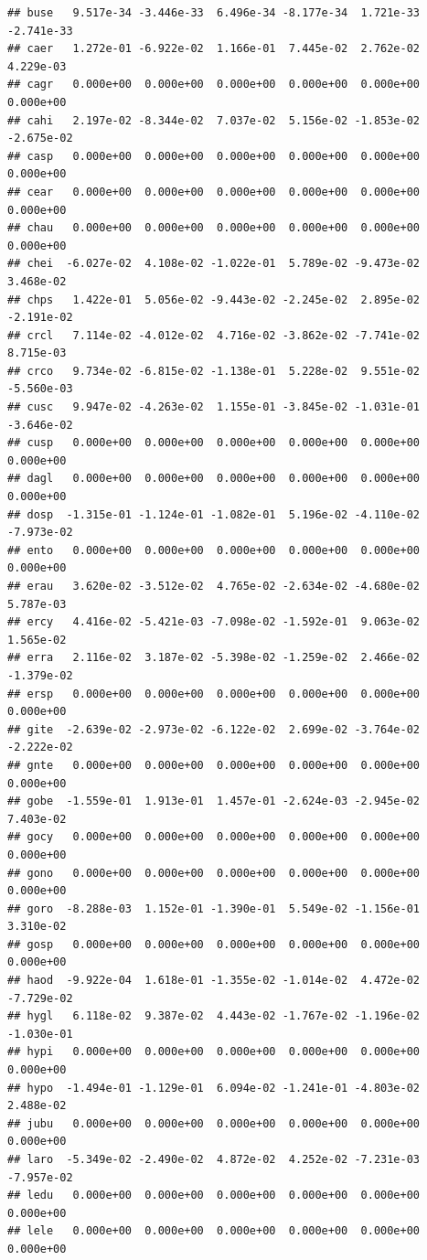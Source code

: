 \documentclass[
]{article}
\begin{document}
\begin{verbatim}
## buse   9.517e-34 -3.446e-33  6.496e-34 -8.177e-34  1.721e-33 -2.741e-33
## caer   1.272e-01 -6.922e-02  1.166e-01  7.445e-02  2.762e-02  4.229e-03
## cagr   0.000e+00  0.000e+00  0.000e+00  0.000e+00  0.000e+00  0.000e+00
## cahi   2.197e-02 -8.344e-02  7.037e-02  5.156e-02 -1.853e-02 -2.675e-02
## casp   0.000e+00  0.000e+00  0.000e+00  0.000e+00  0.000e+00  0.000e+00
## cear   0.000e+00  0.000e+00  0.000e+00  0.000e+00  0.000e+00  0.000e+00
## chau   0.000e+00  0.000e+00  0.000e+00  0.000e+00  0.000e+00  0.000e+00
## chei  -6.027e-02  4.108e-02 -1.022e-01  5.789e-02 -9.473e-02  3.468e-02
## chps   1.422e-01  5.056e-02 -9.443e-02 -2.245e-02  2.895e-02 -2.191e-02
## crcl   7.114e-02 -4.012e-02  4.716e-02 -3.862e-02 -7.741e-02  8.715e-03
## crco   9.734e-02 -6.815e-02 -1.138e-01  5.228e-02  9.551e-02 -5.560e-03
## cusc   9.947e-02 -4.263e-02  1.155e-01 -3.845e-02 -1.031e-01 -3.646e-02
## cusp   0.000e+00  0.000e+00  0.000e+00  0.000e+00  0.000e+00  0.000e+00
## dagl   0.000e+00  0.000e+00  0.000e+00  0.000e+00  0.000e+00  0.000e+00
## dosp  -1.315e-01 -1.124e-01 -1.082e-01  5.196e-02 -4.110e-02 -7.973e-02
## ento   0.000e+00  0.000e+00  0.000e+00  0.000e+00  0.000e+00  0.000e+00
## erau   3.620e-02 -3.512e-02  4.765e-02 -2.634e-02 -4.680e-02  5.787e-03
## ercy   4.416e-02 -5.421e-03 -7.098e-02 -1.592e-01  9.063e-02  1.565e-02
## erra   2.116e-02  3.187e-02 -5.398e-02 -1.259e-02  2.466e-02 -1.379e-02
## ersp   0.000e+00  0.000e+00  0.000e+00  0.000e+00  0.000e+00  0.000e+00
## gite  -2.639e-02 -2.973e-02 -6.122e-02  2.699e-02 -3.764e-02 -2.222e-02
## gnte   0.000e+00  0.000e+00  0.000e+00  0.000e+00  0.000e+00  0.000e+00
## gobe  -1.559e-01  1.913e-01  1.457e-01 -2.624e-03 -2.945e-02  7.403e-02
## gocy   0.000e+00  0.000e+00  0.000e+00  0.000e+00  0.000e+00  0.000e+00
## gono   0.000e+00  0.000e+00  0.000e+00  0.000e+00  0.000e+00  0.000e+00
## goro  -8.288e-03  1.152e-01 -1.390e-01  5.549e-02 -1.156e-01  3.310e-02
## gosp   0.000e+00  0.000e+00  0.000e+00  0.000e+00  0.000e+00  0.000e+00
## haod  -9.922e-04  1.618e-01 -1.355e-02 -1.014e-02  4.472e-02 -7.729e-02
## hygl   6.118e-02  9.387e-02  4.443e-02 -1.767e-02 -1.196e-02 -1.030e-01
## hypi   0.000e+00  0.000e+00  0.000e+00  0.000e+00  0.000e+00  0.000e+00
## hypo  -1.494e-01 -1.129e-01  6.094e-02 -1.241e-01 -4.803e-02  2.488e-02
## jubu   0.000e+00  0.000e+00  0.000e+00  0.000e+00  0.000e+00  0.000e+00
## laro  -5.349e-02 -2.490e-02  4.872e-02  4.252e-02 -7.231e-03 -7.957e-02
## ledu   0.000e+00  0.000e+00  0.000e+00  0.000e+00  0.000e+00  0.000e+00
## lele   0.000e+00  0.000e+00  0.000e+00  0.000e+00  0.000e+00  0.000e+00

\end{verbatim}
\end{document}

